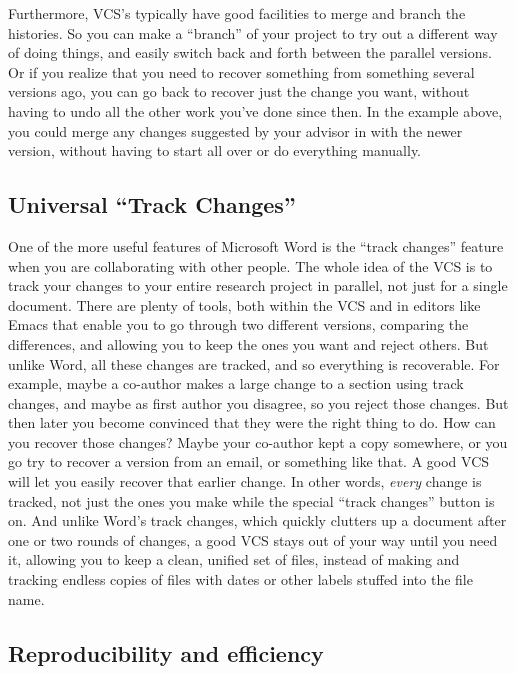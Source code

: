 \documentclass{article}
\begin{document}
Furthermore, VCS's typically have good facilities to merge and branch the histories. So you can make a ``branch'' of your project to try out a different way of doing things, and easily switch back and forth between the parallel versions.  Or if you realize that you need to recover something from something several versions ago, you can go back to recover just the change you want, without having to undo all the other work you've done since then. In the example above, you could merge any changes suggested by your advisor in with the newer version, without having to start all over or do everything manually.
\subsection{Universal ``Track Changes''}
\label{sec-2-3}

One of the more useful features of Microsoft Word is the ``track changes'' feature when you are collaborating with other people.  The whole idea of the VCS is to track your changes to your entire research project in parallel, not just for a single document. There are plenty of tools, both within the VCS and in editors like Emacs that enable you to go through two different versions, comparing the differences, and allowing you to keep the ones you want and reject others.  But unlike Word, all these changes are tracked, and so everything is recoverable. For example, maybe a co-author makes a large change to a section using track changes, and maybe as first author you disagree, so you reject those changes. But then later you become convinced that they were the right thing to do.  How can you recover those changes?  Maybe your co-author kept a copy somewhere, or you go try to recover a version from an email, or something like that. A good VCS will let you easily recover that earlier change.  In other words, \emph{every} change is tracked, not just the ones you make while the special ``track changes'' button is on. And unlike Word's track changes, which quickly clutters up a document after one or two rounds of changes, a good VCS stays out of your way until you need it, allowing you to keep a clean, unified set of files, instead of making and tracking endless copies of files with dates or other labels stuffed into the file name.
\subsection{Reproducibility and efficiency}
\label{sec-2-4}
\end{document}
